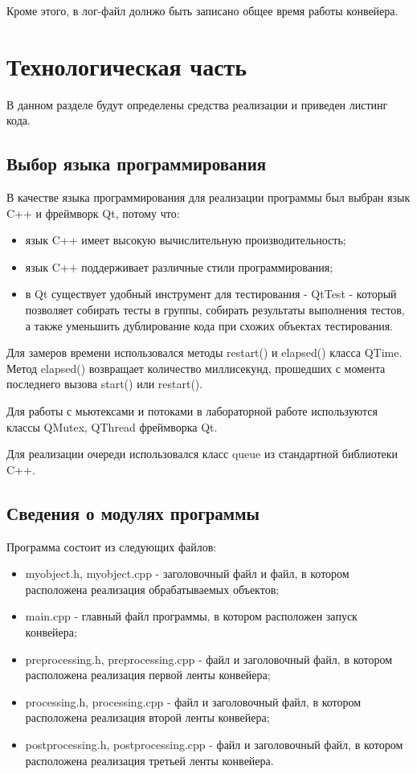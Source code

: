 \documentclass[a4paper,14pt]{report}
\begin{document}
Кроме этого, в лог-файл долнжо быть записано общее время работы конвейера.

\chapter*{Технологическая часть}

В данном разделе будут определены средства реализации и приведен листинг кода.

\section*{Выбор языка программирования}

В качестве языка программирования для реализации программы был выбран язык C++ и фреймворк Qt, потому что:
\begin{itemize}
	\item язык C++ имеет высокую вычислительную производительность;
	\item язык C++ поддерживает различные стили программирования;
	\item в Qt существует удобный инструмент для тестирования - QtTest - который позволяет собирать тесты в группы, собирать результаты выполнения тестов, а также уменьшить дублирование кода при схожих объектах тестирования.
\end{itemize}

Для замеров времени использовался методы restart() и elapsed() класса QTime. Метод elapsed() возвращает количество миллисекунд, прошедших с момента последнего вызова start() или restart().

Для работы с мьютексами и потоками в лабораторной работе используются классы QMutex, QThread фреймворка Qt.

Для реализации очереди использовался класс queue из стандартной библиотеки C++.

\section*{Сведения о модулях программы}

Программа состоит из следующих файлов:
\begin{itemize}
	\item myobject.h, myobject.cpp - заголовочный файл и файл, в котором расположена реализация обрабатываемых объектов;
	\item main.cpp - главный файл программы, в котором расположен запуск конвейера;
	\item preprocessing.h, preprocessing.cpp - файл и заголовочный файл, в котором расположена реализация первой ленты конвейера;
	\item processing.h, processing.cpp - файл и заголовочный файл, в котором расположена реализация второй ленты конвейера;
	\item postprocessing.h, postprocessing.cpp - файл и заголовочный файл, в котором расположена реализация третьей ленты конвейера.
\end{itemize}
\end{document}
